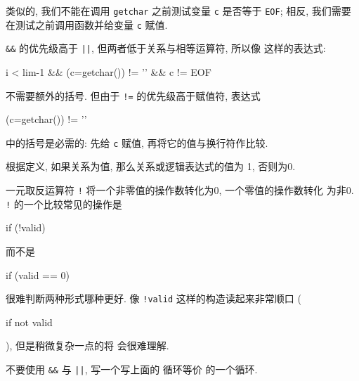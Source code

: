 类似的, 我们不能在调用 \verb"getchar" 之前测试变量 \verb"c" 是否等于
\verb"EOF"; 相反, 我们需要在测试之前调用函数并给变量 \verb"c" 赋值.

\verb"&&" 的优先级高于 \verb"||", 但两者低于关系与相等运算符, 所以像
这样的表达式:
\begin{myverbatim}
    i < lim-1 && (c=getchar()) != '\n' && c != EOF 
\end{myverbatim}
不需要额外的括号. 但由于 \verb"!=" 的优先级高于赋值符, 表达式 
\begin{myverbatim}
    (c=getchar()) != '\n'
\end{myverbatim}
中的括号是必需的: 先给 \verb"c" 赋值, 再将它的值与换行符作比较.

根据定义, 如果关系为值, 那么关系或逻辑表达式的值为 1, 否则为0.

一元取反运算符 \verb"!" 将一个非零值的操作数转化为0, 一个零值的操作数转化
为非0. \verb"!" 的一个比较常见的操作是
\begin{myverbatim}
    if (!valid)
\end{myverbatim}
而不是
\begin{myverbatim}
    if (valid == 0)
\end{myverbatim}
很难判断两种形式哪种更好. 像 \verb"!valid" 这样的构造读起来非常顺口
(\begin{myquotation}if not valid\end{myquotation}), 但是稍微复杂一点的将
会很难理解.

\exercise 不要使用 \verb"&&" 与 \verb"||", 写一个写上面的 \cfor 循环等价
的一个循环.

